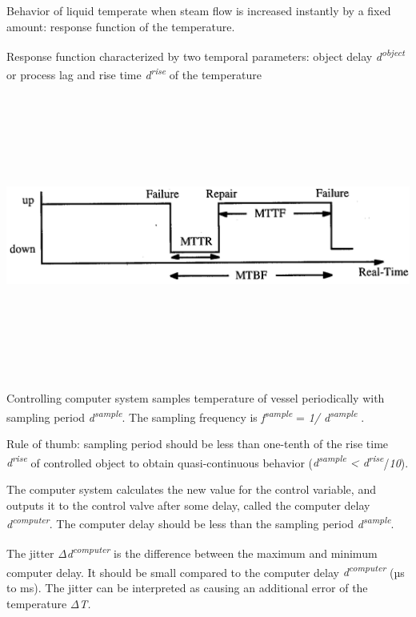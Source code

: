 Behavior of liquid temperate when steam flow is increased instantly by a
fixed amount: response function of the temperature.

Response function characterized by two temporal parameters: object delay
\emph{d\textsuperscript{object}} or process lag and rise time
\emph{d\textsuperscript{rise}} of the temperature

\includegraphics[width=7.02153in,height=3.66736in]{media/Fig_1_7.png}

Controlling computer system samples temperature of vessel periodically
with sampling period \emph{d\textsuperscript{sample}}. The sampling
frequency is \emph{f\textsuperscript{sample}} = \emph{1/
d\textsuperscript{sample}} .

Rule of thumb: sampling period should be less than one-tenth of the rise
time \emph{d\textsuperscript{rise}} of controlled object to obtain
quasi-continuous behavior (\emph{d\textsuperscript{sample} \textless{}
d\textsuperscript{rise}}/\emph{10}).

The computer system calculates the new value for the control variable,
and outputs it to the control valve after some delay, called the
computer delay \emph{d\textsuperscript{computer}}. The computer delay
should be less than the sampling period
\emph{d\textsuperscript{sample}}.

The jitter \emph{Δd\textsuperscript{computer}} is the difference between
the maximum and minimum computer delay. It should be small compared to
the computer delay \emph{d\textsuperscript{computer}} (µs to ms). The
jitter can be interpreted as causing an additional error of the
temperature \emph{ΔT.}

